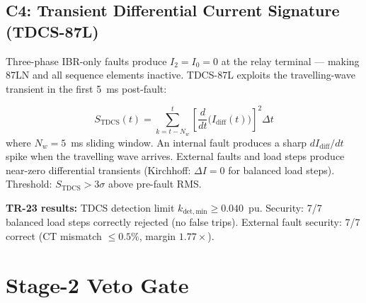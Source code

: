 \documentclass[12pt,a4paper]{article}
\newcommand{\Idiff}{I_\mathrm{diff}}
\begin{document}
\subsection{C4: Transient Differential Current Signature (TDCS-87L)}

Three-phase IBR-only faults produce $I_2 = I_0 = 0$ at the relay terminal --- making 87LN and all sequence elements inactive. TDCS-87L exploits the travelling-wave transient in the first 5~ms post-fault:

\begin{equation}
  S_\mathrm{TDCS}(t) = \sum_{k=t-N_w}^{t}
  \left[\frac{d}{dt}\bigl(\Idiff(t)\bigr)\right]^2 \Delta t
  \label{eq:tdcs}
\end{equation}
where $N_w = 5$~ms sliding window. An internal fault produces a sharp $dI_\mathrm{diff}/dt$ spike when the travelling wave arrives. External faults and load steps produce near-zero differential transients (Kirchhoff: $\Delta I = 0$ for balanced load steps). Threshold: $S_\mathrm{TDCS} > 3\sigma$ above pre-fault RMS.

\textbf{TR-23 results:} TDCS detection limit $k_\mathrm{det,min} \geq 0.040$~pu. Security: 7/7 balanced load steps correctly rejected (no false trips). External fault security: 7/7 correct (CT mismatch $\leq 0.5\%$, margin $1.77\times$).

\section{Stage-2 Veto Gate}
\end{document}
